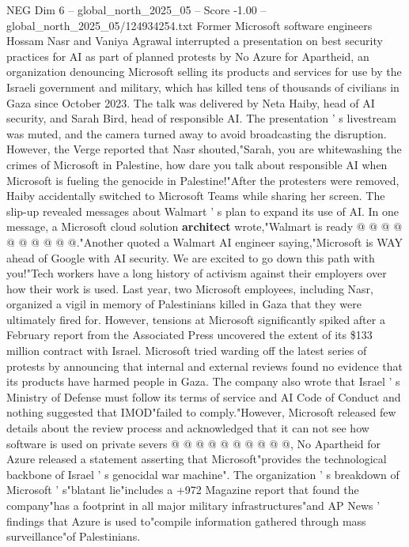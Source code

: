\begin{textsample}{NEG Dim 6 – global\_north\_2025\_05 – Score -1.00 – global\_north\_2025\_05/124934254.txt}  \label{ex:f6_neg_377}
Former Microsoft software engineers Hossam Nasr and Vaniya Agrawal interrupted a presentation on best security practices for AI as part of planned protests by No Azure for Apartheid, an organization denouncing Microsoft selling its products and services for use by the Israeli government and military, which has killed tens of thousands of civilians in Gaza since October 2023.
The talk was delivered by Neta Haiby, head of AI security, and Sarah Bird, head of responsible AI.
The presentation ' s livestream was muted, and the camera turned away to avoid broadcasting the disruption.
However, the Verge reported that Nasr shouted,"Sarah, you are whitewashing the crimes of Microsoft in Palestine, how dare you talk about responsible AI when Microsoft is fueling the genocide in Palestine!"After the protesters were removed, Haiby accidentally switched to Microsoft Teams while sharing her screen.
The slip-up revealed messages about Walmart ' s plan to expand its use of AI.
In one message, a Microsoft cloud solution \textbf{architect} wrote,"Walmart is ready @ @ @ @ @ @ @ @ @ @."Another quoted a Walmart AI engineer saying,"Microsoft is WAY ahead of Google with AI security.
We are excited to go down this path with you!"Tech workers have a long history of activism against their employers over how their work is used.
Last year, two Microsoft employees, including Nasr, organized a vigil in memory of Palestinians killed in Gaza that they were ultimately fired for.
However, tensions at Microsoft significantly spiked after a February report from the Associated Press uncovered the extent of its \$133 million contract with Israel.
Microsoft tried warding off the latest series of protests by announcing that internal and external reviews found no evidence that its products have harmed people in Gaza.
The company also wrote that Israel ' s Ministry of Defense must follow its terms of service and AI Code of Conduct and nothing suggested that IMOD"failed to comply."However, Microsoft released few details about the review process and acknowledged that it can not see how software is used on private severs @ @ @ @ @ @ @ @ @ @, No Apartheid for Azure released a statement asserting that Microsoft"provides the technological backbone of Israel ' s genocidal war machine".
The organization ' s breakdown of Microsoft ' s"blatant lie"includes a +972 Magazine report that found the company"has a footprint in all major military infrastructures"and AP News ' findings that Azure is used to"compile information gathered through mass surveillance"of Palestinians.

\end{textsample}
